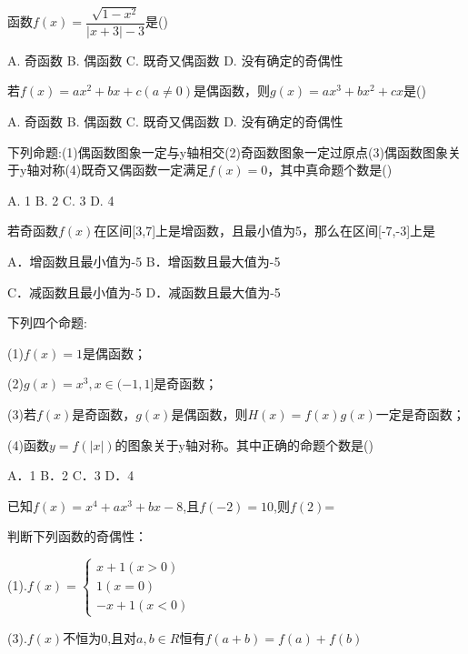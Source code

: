 \begin{example}
函数$f(x)=\dfrac{\sqrt{1-x^2}}{|x+3|-3}$是(\qquad)\par
A. 奇函数  \hfil  B. 偶函数 \hfil   C. 既奇又偶函数  \hfil D. 没有确定的奇偶性
\end{example}
\begin{example}
若$f(x)=ax^2+bx+c(a\neq 0)$是偶函数，则$g(x)=ax^3+bx^2+cx$是(\qquad)\par
A. 奇函数 \hfil B. 偶函数 \hfil  C. 既奇又偶函数 \hfil   D. 没有确定的奇偶性
\end{example}
\begin{example}
下列命题:(1)偶函数图象一定与y轴相交(2)奇函数图象一定过原点(3)偶函数图象关于y轴对称(4)既奇又偶函数一定满足$f(x)=0$，其中真命题个数是(\qquad)\par
A. 1    \hfil   B. 2   \hfil    C. 3   \hfil     D. 4
\end{example}
\begin{example}
若奇函数$f(x)$在区间[3,7]上是增函数，且最小值为5，那么在区间[-7,-3]上是\par
A．增函数且最小值为-5 \hfil   B．增函数且最大值为-5  \par
C．减函数且最小值为-5  \hfil  D．减函数且最大值为-5
\end{example}
\begin{example}
下列四个命题:\par
(1)$f(x)=1$是偶函数；\par
(2)$g(x)=x^3,x\in (-1,1]$是奇函数；\par
(3)若$f(x)$是奇函数，$g(x)$是偶函数，则$H(x)=f(x)g(x)$一定是奇函数；\par
(4)函数$y=f(|x|)$的图象关于y轴对称。其中正确的命题个数是(\qquad)\par
A．1    \hfil       B．2   \hfil
        C．3    \hfil           D．4
\end{example}
\begin{example}
已知$f(x)=x^4+ax^3+bx-8$,且$f(-2)=10$,则$f(2)$=\underline{\qquad}
\end{example}
\begin{example}
判断下列函数的奇偶性：\par
(1).$ f(x)=\begin{cases}
 x+1(x>0)\\
1(x=0)\\
-x+1(x<0) \end{cases} $ \underline{\qquad} \par
(3).$f(x)$不恒为0,且对$a,b\in R $恒有$f(a+b)=f(a)+f(b)$\underline{\qquad}

\end{example}
